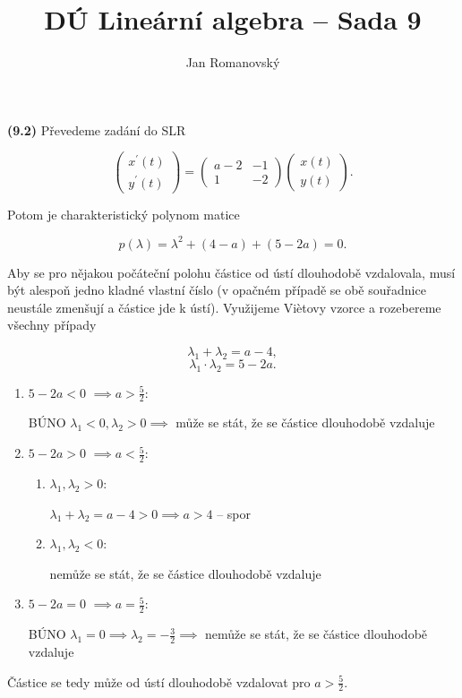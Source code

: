 \documentclass{article}
\title{DÚ Lineární algebra -- Sada 9}
\author{Jan Romanovský}
\begin{document}
\maketitle

\textbf{(9.2)} Převedeme zadání do SLR

$$\begin{pmatrix}
  x^\prime(t) \\ y^\prime(t)
\end{pmatrix}=\begin{pmatrix}
  a-2 & -1 \\ 1 & -2
\end{pmatrix}\begin{pmatrix}
  x(t) \\ y(t)
\end{pmatrix}.$$

Potom je charakteristický polynom matice

$$p(\lambda)=\lambda^2+(4-a)+(5-2a)=0.$$

Aby se pro nějakou počáteční polohu částice od ústí dlouhodobě vzdalovala, musí být alespoň jedno kladné vlastní číslo (v opačném případě se obě souřadnice neustále zmenšují a částice jde k ústí). Využijeme Viètovy vzorce a rozebereme všechny případy

\begin{equation}\label{dva}
  \lambda_1+\lambda_2=a-4,
\end{equation}
\begin{equation}\label{dva}
  \lambda_1\cdot\lambda_2=5-2a.
\end{equation}

\begin{enumerate}
  \item \underline{$5-2a<0$} $\implies a> \frac{5}{2}$:

  BÚNO $\lambda_1 <0, \lambda_2>0 \implies$ může se stát, že se částice dlouhodobě vzdaluje
  \item \underline{$5-2a>0$} $\implies a < \frac{5}{2}$:
  \begin{enumerate}
    \item \underline{$\lambda_1, \lambda_2>0$}:

    $\lambda_1+\lambda_2 = a - 4 >0\implies a > 4$ -- spor
    \item \underline{$\lambda_1, \lambda_2<0$}:

    nemůže se stát, že se částice dlouhodobě vzdaluje
  \end{enumerate}
  \item \underline{$5-2a=0$} $\implies a =\frac{5}{2}$:

  BÚNO $\lambda_1 = 0 \implies \lambda_2=-\frac{3}{2}\implies$ nemůže se stát, že se částice dlouhodobě vzdaluje
\end{enumerate}

Částice se tedy může od ústí dlouhodobě vzdalovat pro $a > \frac{5}{2}$.
\end{document}
